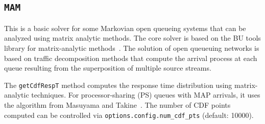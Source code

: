 
\subsection{\texttt{MAM}}
This is a basic solver for some Markovian open queueing systems that can be analyzed using matrix analytic methods. The core solver is based on the {BU tools} library for matrix-analytic methods~\cite{Hor17}. The solution of open queueuing networks is based on traffic decomposition methods that compute the arrival process at each queue resulting from the superposition of multiple source streams.

The \texttt{getCdfRespT} method computes the response time distribution using matrix-analytic techniques. For processor-sharing (PS) queues with MAP arrivals, it uses the algorithm from Masuyama and Takine~\cite{MasuyamaTakine2003}. The number of CDF points computed can be controlled via \texttt{options.config.num\_cdf\_pts} (default: 10000).

